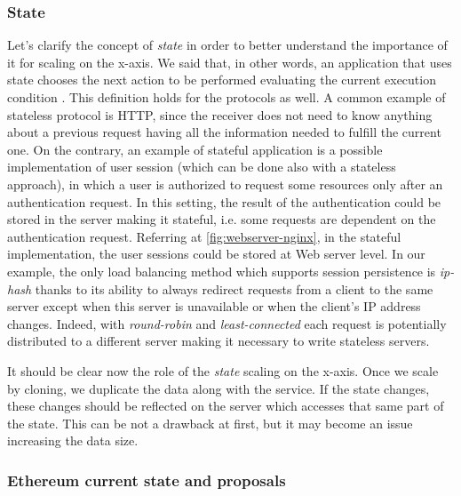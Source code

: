 \subsubsection{State}
Let's clarify the concept of \emph{state} in order to better understand the
importance of it for scaling on the x-axis. We said that, in other words, an
application that uses state chooses the next action to be performed evaluating
the current execution condition \cite{bib:art-of-scalability}. This definition
holds for the protocols as well. A common example of stateless protocol is HTTP,
since the receiver does not need to know anything about a previous request
having all the information needed to fulfill the current one. On the contrary,
an example of stateful application is a possible implementation of user session
(which can be done also with a stateless approach), in which a user is
authorized to request some resources only after an authentication request. In
this setting, the result of the authentication could be stored in the server
making it stateful, i.e. some requests are dependent on the authentication
request. Referring at \autoref{fig:webserver-nginx}, in the stateful
implementation, the user sessions could be stored at Web server level. In our
example, the only load balancing method which supports session persistence is
\emph{ip-hash} thanks to its ability to always redirect requests from a client
to the same server except when this server is unavailable or when the client's
IP address changes. Indeed, with \emph{round-robin} and \emph{least-connected}
each request is potentially distributed to a different server making it
necessary to write stateless servers.

It should be clear now the role of the \emph{state} scaling on the x-axis. Once
we scale by cloning, we duplicate the data along with the service. If the state
changes, these changes should be reflected on the server which accesses that
same part of the state. This can be not a drawback at first, but it may become
an issue increasing the data size.

\subsubsection{Ethereum current state and proposals}
\label{sec:x-axis-ethereum}

